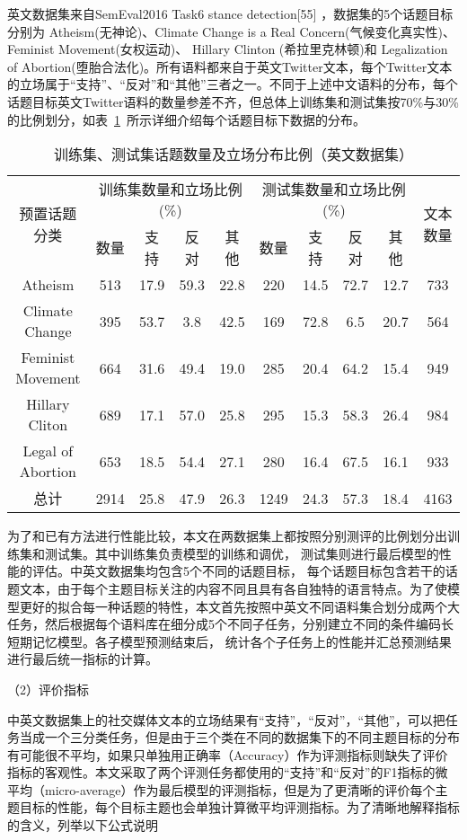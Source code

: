 英文数据集来自SemEval2016 Task6 stance detection[55] ，数据集的5个话题目标分别为 Atheism(无神论)、Climate Change is a Real Concern(气候变化真实性)、Feminist Movement(女权运动)、 Hillary Clinton (希拉里克林顿)和
Legalization of Abortion(堕胎合法化)。所有语料都来自于英文Twitter文本，每个Twitter文本的立场属于“支持”、“反对”和“其他”三者之一。不同于上述中文语料的分布，每个话题目标英文Twitter语料的数量参差不齐，但总体上训练集和测试集按70\%与30\%的比例划分，如表~\ref{englishdata}~所示详细介绍每个话题目标下数据的分布。


\begin{table}[htbp]
	\caption[table123]{训练集、测试集话题数量及立场分布比例（英文数据集）}
	\label{englishdata}
	\vspace{0.5em}\centering\wuhao
	\begin{tabular}{cccccccccc}
		\toprule[1.5pt]
		\multirow{2}{*}{预置话题分类}& \multicolumn{4}{c}{训练集数量和立场比例(\%)} 
		& \multicolumn{4}{c}{测试集数量和立场比例(\%)}  &\multirow{2}{*}{文本数量}\\
		\cline{2-9}
		\quad&数量& 支持&反对&其他&数量& 支持&反对&其他 \\
		\midrule[1pt]
		Atheism&513&17.9&59.3&22.8&220&14.5&72.7&12.7&733\\
		Climate Change&395&53.7&3.8&42.5&169&72.8&6.5&20.7&564\\
		Feminist Movement&664&31.6&49.4&19.0&285&20.4&64.2&15.4&949\\
		Hillary Cliton&689&17.1&57.0&25.8&295&15.3&58.3&26.4&984\\
		Legal of Abortion&653&18.5&54.4&27.1&280&16.4&67.5&16.1&933\\
		总计&2914&25.8&47.9&26.3&1249&24.3&57.3&18.4&4163\\
		\bottomrule[1.5pt]
	\end{tabular}
\end{table}

为了和已有方法进行性能比较，本文在两数据集上都按照分别测评的比例划分出训练集和测试集。其中训练集负责模型的训练和调优， 测试集则进行最后模型的性能的评估。中英文数据集均包含5个不同的话题目标， 每个话题目标包含若干的话题文本，由于每个主题目标关注的内容不同且具有各自独特的语言特点。为了使模型更好的拟合每一种话题的特性，本文首先按照中英文不同语料集合划分成两个大任务，然后根据每个语料库在细分成5个不同子任务，分别建立不同的条件编码长短期记忆模型。各子模型预测结束后， 统计各个子任务上的性能并汇总预测结果进行最后统一指标的计算。

（2）评价指标

中英文数据集上的社交媒体文本的立场结果有“支持”，“反对”，“其他”，可以把任务当成一个三分类任务，但是由于三个类在不同的数据集下的不同主题目标的分布有可能很不平均，如果只单独用正确率（Accuracy）作为评测指标则缺失了评价指标的客观性。本文采取了两个评测任务都使用的“支持”和“反对”的F1指标的微平均（micro-average）作为最后模型的评测指标，但是为了更清晰的评价每个主题目标的性能，每个目标主题也会单独计算微平均评测指标。为了清晰地解释指标的含义，列举以下公式说明

